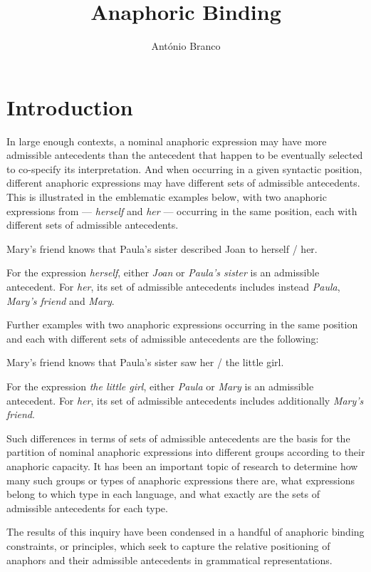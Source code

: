 \documentclass[output=paper
,modfonts
,nonflat]{langsci/langscibook}
\title{Anaphoric Binding}
\author{%
 Ant\'onio Branco\affiliation{University of Lisbon}
}
\begin{document}
\label{chap-binding}

\section{Introduction} 


In large enough contexts, a nominal anaphoric expression may have more
admissible antecedents than the antecedent that happen
to be eventually selected to co-specify its interpretation. 
And when occurring in a given syntactic position, different anaphoric expressions may 
have different sets of admissible antecedents. This is illustrated in the emblematic examples 
below, with two anaphoric expressions from  --- \textit{herself} and \textit{her} --- 
occurring in the same position, each with different sets of admissible antecedents.

\begin{exe}
\ex Mary's friend knows that Paula's sister described Joan to herself / her.
\end{exe}

For the expression \textit{herself}, either \textit{Joan} or \textit{Paula's sister} is an admissible antecedent. 
For \textit{her}, its set of admissible antecedents includes instead \textit{Paula}, \textit{Mary's friend} and \textit{Mary}.

Further examples with two anaphoric expressions occurring in the same position
and each with different sets of admissible antecedents are the following:

\begin{exe}
\ex Mary's friend knows that Paula's sister saw her / the little girl.
\end{exe}

For the expression \textit{the little girl}, either \textit{Paula} or \textit{Mary} is an admissible antecedent. 
For \textit{her}, its set of admissible antecedents includes additionally \textit{Mary's friend}.

Such differences in terms of sets of admissible antecedents are the basis for 
the partition of nominal anaphoric expressions into different groups according to their anaphoric
capacity. It has been an important topic of research to determine
how many such  groups or types of anaphoric expressions there are, what expressions belong
to which type in each language, and what exactly are the sets of admissible antecedents for each type.

The results of this inquiry have been condensed in a handful of anaphoric 
binding constraints, or principles, which seek to capture the relative positioning of anaphors and their 
admissible antecedents in grammatical representations. 
\end{document}
